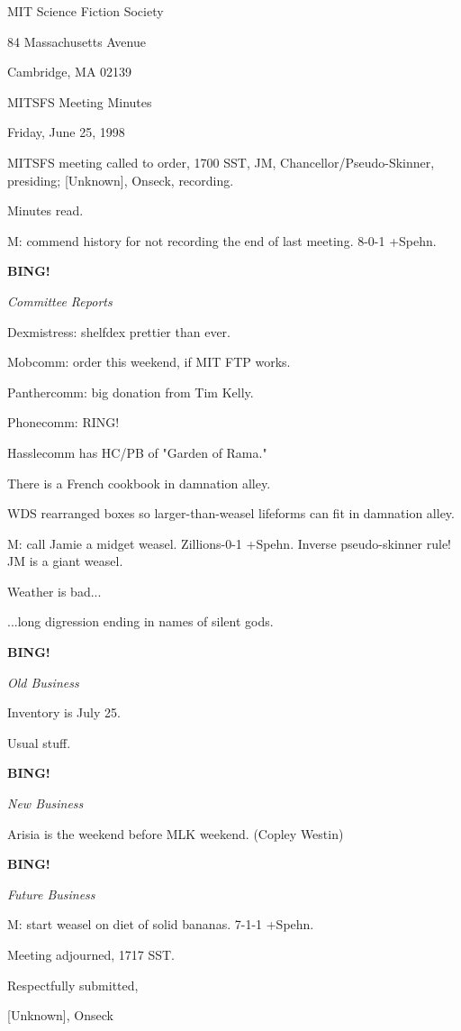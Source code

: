 \documentclass[12pt]{article}
\newcommand{\bing}{{\bf BING!} }
\newcommand{\goto}[1]{\bing \vskip 12pt \centerline{{\em{#1}}}}
\begin{document}
\begin{center}

MIT Science Fiction Society 

84 Massachusetts Avenue

Cambridge, MA 02139

\vspace{12pt}

MITSFS Meeting Minutes 

Friday, June 25, 1998

\end{center}
 
\vspace{18pt}

\setlength{\parskip}{6pt}

\noindent
MITSFS meeting called to order, 1700 SST,
JM, Chancellor/Pseudo-Skinner, presiding; [Unknown], Onseck, recording.

Minutes read.

M: commend history for not recording the end of last meeting. 8-0-1 +Spehn.

\goto{Committee Reports}

Dexmistress: shelfdex prettier than ever.

Mobcomm: order this weekend, if MIT FTP works.

Panthercomm: big donation from Tim Kelly.

Phonecomm: RING!

Hasslecomm has HC/PB of "Garden of Rama."

There is a French cookbook in damnation alley.

WDS rearranged boxes so larger-than-weasel lifeforms can fit in damnation alley.

M: call Jamie a midget weasel. Zillions-0-1 +Spehn. Inverse pseudo-skinner rule! JM is a giant weasel.

Weather is bad...

...long digression ending in names of silent gods.

\goto{Old Business}

Inventory is July 25.

Usual stuff.

\goto{New Business}

Arisia is the weekend before MLK weekend. (Copley Westin)

\goto{Future Business}

M: start weasel on diet of solid bananas. 7-1-1 +Spehn.

\vspace{12pt}

\noindent
Meeting adjourned, 1717 SST.

\vspace{18pt}

\centerline{Respectfully submitted,}
\centerline{[Unknown], Onseck}
\end{document}
